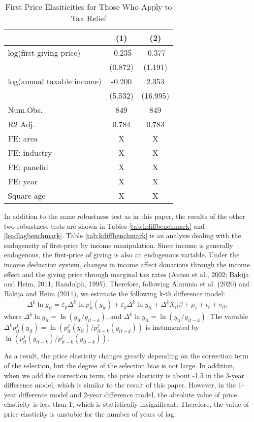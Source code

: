 \documentclass[
  11pt,
  a4paper,
]{article}
\begin{document}
\begin{table}

\caption{\label{tab:leadlagbenchmark}First Price Elasiticities for Those Who Apply to Tax Relief}
\centering
\begin{tabular}[t]{lcc}
\toprule
  & (1) & (2)\\
\midrule
log(first giving price) & -0.235 & -0.377\\
 & (0.872) & (1.191)\\
log(annual taxable income) & -0.200 & 2.353\\
 & (5.532) & (16.995)\\
\midrule
Num.Obs. & 849 & 849\\
R2 Adj. & 0.784 & 0.783\\
FE: area & X & X\\
FE: industry & X & X\\
FE: panelid & X & X\\
FE: year & X & X\\
Square age & X & X\\
\bottomrule
\end{tabular}
\end{table}

In addition to the same robustness test as in this paper,
the results of the other two robustness tests
are shown in Tables \ref{tab:kdiffbenchmark} and \ref{leadlagbenchmark}.
Table \ref{tab:kdiffbenchmark} is an analysis dealing with
the endogeneity of first-price by income manipulation.
Since income is generally endogenous,
the first-price of giving is also an endogenous variable.
Under the income deduction system,
changes in income affect donations through the income effect
and the giving price through marginal tax rates
(Auten et al., 2002; Bakija and Heim, 2011; Randolph, 1995).
Therefore, following Almunia et al. (2020) and Bakija and Heim (2011),
we estimate the following k-th difference model:
\begin{align}
  \Delta^k \ln g_{it} = \varepsilon_p \Delta^k \ln p^f_{it}(y_{it})
  + \varepsilon_y \Delta^k \ln y_{it} + \Delta^k X_{it} \beta
  + \mu_i + \iota_t + v_{it},
\end{align}
where \(\Delta^k \ln g_{it} = \ln (g_{it} / g_{it-k})\),
and \(\Delta^k \ln y_{it} = \ln (y_{it} / y_{it-k})\).
The variable
\(\Delta^k p^f_{it}(y_{it}) = \ln (p^f_{it}(y_{it}) / p^f_{it-k}(y_{it-k}))\)
is instumented by \(\ln (p^f_{it}(y_{it-k})/p^f_{it-k}(y_{it-k}))\).

As a result,
the price elasticity changes greatly
depending on the correction term of the selection,
but the degree of the selection bias is not large.
In addition, when we add the correction term,
the price elasticity is about -1.5 in the 3-year difference model,
which is similar to the result of this paper.
However, in the 1-year difference model and 2-year difference model,
the absolute value of price elasticity is less than 1,
which is statistically insignificant.
Therefore, the value of price elasticity is unstable
for the number of years of lag.
\end{document}
